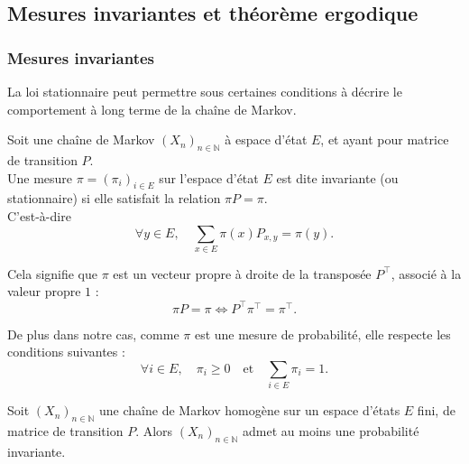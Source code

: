 \documentclass{article}
\begin{document}

\newpage %
\subsection{Mesures invariantes et théorème ergodique}

\subsubsection{Mesures invariantes}

La loi stationnaire peut permettre sous certaines conditions à décrire le comportement à long terme de la chaîne de Markov. \\ %

\begin{tcolorbox}[colback=white,colframe=red!80!black,title=Mesure invariante/stationnaire]
Soit une chaîne de Markov $(X_n)_{n \in \mathbb{N}}$ à espace d'état $E$, et ayant pour matrice de transition $P$. \\

Une mesure $\pi = (\pi_i)_{i \in E}$ sur l'espace d'état $E$ est dite invariante (ou stationnaire) si elle satisfait la relation $\pi P = \pi$. \\

C'est-à-dire
\[
\forall y \in E, \quad \sum_{x \in E} \pi(x) P_{x, y} = \pi(y).
\]
\end{tcolorbox}

Cela signifie que $\pi$ est un vecteur propre à droite de la transposée $P^{\top}$, associé à la valeur propre $1$ :
\[
\pi P = \pi \iff P^{\top} \pi^{\top} = \pi^{\top}.
\]

De plus dans notre cas, comme $\pi$ est une mesure de probabilité, elle respecte les conditions suivantes :
\[
\forall i \in E, \quad \pi_i \geq 0 \quad \text{et} \quad \sum_{i \in E} \pi_i = 1.
\]

\begin{tcolorbox}[colback=white,colframe=blue!80!black,title=Existence d'une probabilité invariante]
Soit $(X_n)_{n \in \mathbb{N}}$ une chaîne de Markov homogène sur un espace d'états $E$ fini, de matrice de transition $P$. Alors $(X_n)_{n \in \mathbb{N}}$ admet au moins une probabilité invariante.
\end{tcolorbox}
\end{document}
